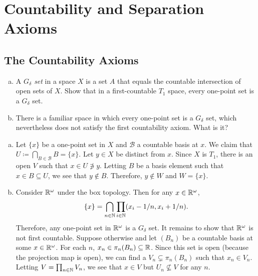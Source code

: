 \section{Countability and Separation Axioms}

\setcounter{subsection}{29}
\subsection{The Countability Axioms}

	\begin{exercise}
		\phantom{oh}
		\begin{enumerate}[(a)]
			\item A \textit{$G_\delta$ set} in a space $X$ is a set $A$ that equals the countable intersection of open sets of $X$. Show that in a first-countable $T_1$ space, every one-point set is a $G_\delta$ set.
			\item There is a familiar space in which every one-point set is a $G_\delta$ set, which nevertheless does not satisfy the first countability axiom. What is it?
		\end{enumerate}
	\end{exercise}
	\begin{solution*}
		\begin{enumerate}[(a)]
			\item Let $\{x\}$ be a one-point set in $X$ and $\mathcal{B}$ a countable basis at $x$. We claim that $U \coloneqq \bigcap_{B\in\mathcal{B}} B = \{x\}$. Let $y\in X$ be distinct from $x$. Since $X$ is $T_1$, there is an open $V$ such that $x\in U\not\ni y$. Letting $B$ be a basis element such that $x\in B\subseteq U$, we see that $y\not\in B$. Therefore, $y\not\in W$ and $W = \{x\}$.
			\item Consider $\mathbb{R}^\omega$ under the box topology. Then for any $x\in\mathbb{R}^\omega$,
			\[ \{x\} = \bigcap_{n\in\mathbb{N}} \prod_{i\in\mathbb{N}} (x_i - 1/n, x_i + 1/n). \]
			Therefore, any one-point set in $\mathbb{R}^\omega$ is a $G_\delta$ set. It remains to show that $\mathbb{R}^\omega$ is not first countable. Suppose otherwise and let $(B_n)$ be a countable basis at some $x\in\mathbb{R}^\omega$. For each $n$, $x_n \in \pi_n(B_n) \subseteq \mathbb{R}$. Since this set is open (because the projection map is open), we can find a $V_n \subsetneq \pi_n(B_n)$ such that $x_n \in V_n$. Letting $V = \prod_{n\in\mathbb{N}} V_n$, we see that $x \in V$ but $U_n \not\subseteq V$ for any $n$.
		\end{enumerate}
	\end{solution*}

